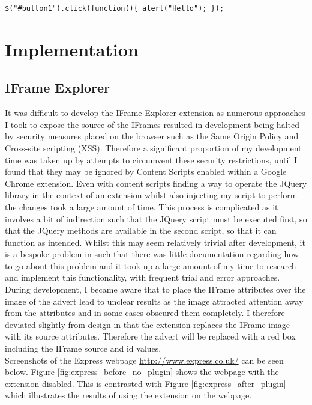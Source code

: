\documentclass[12pt]{article}
\begin{document}
\begin{lstlisting}[caption=Setting the onClick functionality of button in JQuery., label={jqExample}]
$("#button1").click(function(){ alert("Hello"); });
\end{lstlisting}

\pagebreak

\section{Implementation} \label{implementation}

\subsection{IFrame Explorer}
It was difficult to develop the IFrame Explorer extension as numerous approaches I took to expose the source of the IFrames resulted in development being halted by security measures placed on the browser such as the Same Origin Policy and Cross-site scripting (XSS). Therefore a significant proportion of my development time was taken up by attempts to circumvent these security restrictions, until I found that they may be ignored by Content Scripts enabled within a Google Chrome extension. Even with content scripts finding a way to operate the JQuery library in the context of an extension whilst also injecting my script to perform the changes took a large amount of time. This process is complicated as it involves a bit of indirection such that the JQuery script must be executed first, so that the JQuery methods are available in the second script, so that it can function as intended. Whilst this may seem relatively trivial after development, it is a bespoke problem in such that there was little documentation regarding how to go about this problem and it took up a large amount of my time to research and implement this functionality, with frequent trial and error approaches. \\

During development, I became aware that to place the IFrame attributes over the image of the advert lead to unclear results as the image attracted attention away from the attributes and in some cases obscured them completely. I therefore deviated slightly from design in that the extension replaces the IFrame image with its source attributes. Therefore the advert will be replaced with a red box including the IFrame source and id values. \\

Screenshots of the Express webpage \url{http://www.express.co.uk/} can be seen below. Figure \ref{fig:express_before_no_plugin} shows the webpage with the extension disabled. This is contrasted with Figure \ref{fig:express_after_plugin} which illustrates the results of using the extension on the webpage. 
\end{document}
